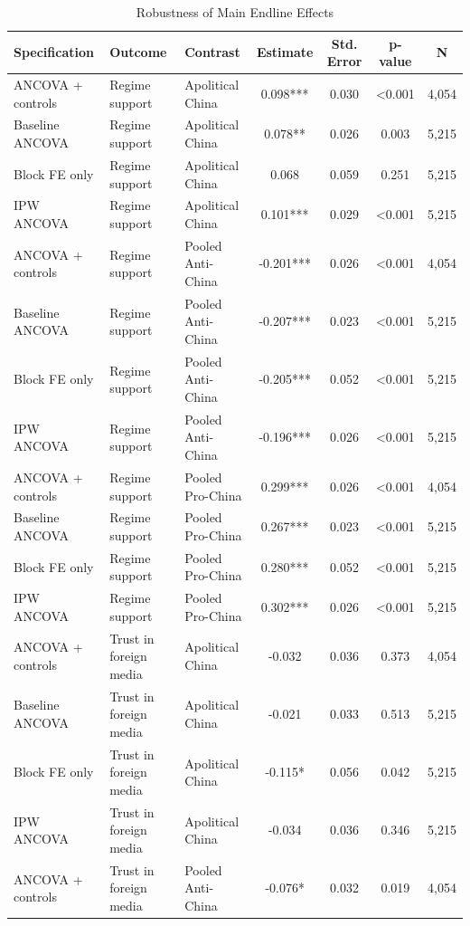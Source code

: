 \begin{table}[H]
\centering
\caption{Robustness of Main Endline Effects}
\label{tab:robustness_main_t1}
\footnotesize
\begin{threeparttable}
\begin{tabular}{lllcccc}
\toprule
Specification & Outcome & Contrast & Estimate & Std. Error & p-value & N \\
\midrule
ANCOVA + controls & Regime support & Apolitical China & 0.098*** & 0.030 & <0.001 & 4,054 \\
Baseline ANCOVA & Regime support & Apolitical China & 0.078** & 0.026 & 0.003 & 5,215 \\
Block FE only & Regime support & Apolitical China & 0.068 & 0.059 & 0.251 & 5,215 \\
IPW ANCOVA & Regime support & Apolitical China & 0.101*** & 0.029 & <0.001 & 5,215 \\
ANCOVA + controls & Regime support & Pooled Anti-China & -0.201*** & 0.026 & <0.001 & 4,054 \\
Baseline ANCOVA & Regime support & Pooled Anti-China & -0.207*** & 0.023 & <0.001 & 5,215 \\
Block FE only & Regime support & Pooled Anti-China & -0.205*** & 0.052 & <0.001 & 5,215 \\
IPW ANCOVA & Regime support & Pooled Anti-China & -0.196*** & 0.026 & <0.001 & 5,215 \\
ANCOVA + controls & Regime support & Pooled Pro-China & 0.299*** & 0.026 & <0.001 & 4,054 \\
Baseline ANCOVA & Regime support & Pooled Pro-China & 0.267*** & 0.023 & <0.001 & 5,215 \\
Block FE only & Regime support & Pooled Pro-China & 0.280*** & 0.052 & <0.001 & 5,215 \\
IPW ANCOVA & Regime support & Pooled Pro-China & 0.302*** & 0.026 & <0.001 & 5,215 \\
ANCOVA + controls & Trust in foreign media & Apolitical China & -0.032 & 0.036 & 0.373 & 4,054 \\
Baseline ANCOVA & Trust in foreign media & Apolitical China & -0.021 & 0.033 & 0.513 & 5,215 \\
Block FE only & Trust in foreign media & Apolitical China & -0.115* & 0.056 & 0.042 & 5,215 \\
IPW ANCOVA & Trust in foreign media & Apolitical China & -0.034 & 0.036 & 0.346 & 5,215 \\
ANCOVA + controls & Trust in foreign media & Pooled Anti-China & -0.076* & 0.032 & 0.019 & 4,054 \\

\end{tabular}
\end{threeparttable}
\end{table}
